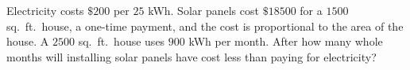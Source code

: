 Electricity costs $\$200$ per $25$ kWh. Solar panels cost $\$18500$ for a $1500$ sq.\ ft.\ house, a one-time payment, and the cost is proportional to the area of the house. A $2500$ sq.\ ft.\ house uses $900$ kWh per month. After how many whole months will installing solar panels have cost less than paying for electricity?
